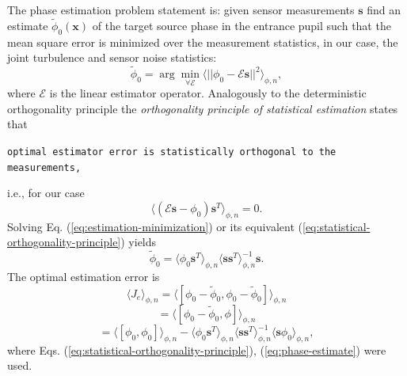 The phase estimation problem statement is: given sensor measurements $\bm{s}$
find an estimate $\tilde{\phi}_{0}(\bm{x})$ of the target source phase in the
entrance pupil such
that the mean square error is minimized over the measurement statistics, in
our case, the joint turbulence and sensor noise statistics:
\begin{equation} \label{eq:estimation-minimization}
	\tilde{\phi}_{0} =
	\arg \min_{\forall \mathcal{E}}
	\langle
	||\phi_{0} - \mathcal{E} \bm{s}||^{2}
	\rangle_{\phi,n},
\end{equation}
where $\mathcal{E}$ is the linear estimator operator.
Analogously to the deterministic orthogonality principle the \emph{orthogonality
principle of statistical estimation}  states that
\begin{flushleft}
	\texttt{optimal estimator error is statistically orthogonal to the
	measurements,}
\end{flushleft}
i.e., for our case
\begin{equation} \label{eq:statistical-orthogonality-principle}
	\langle ( \mathcal{E}\bm{s} - \phi_{0} ) \bm{s}^{T} \rangle_{\phi,n} = 0.
\end{equation}
Solving Eq. (\ref{eq:estimation-minimization}) or its equivalent
(\ref{eq:statistical-orthogonality-principle}) yields
\begin{equation} \label{eq:phase-estimate}
	\tilde{\phi}_{0} = \langle \phi_{0} \bm{s}^{T} \rangle_{\phi,n}
	                   \langle \bm{s} \bm{s}^{T} \rangle_{\phi,n}^{-1} \bm{s}.
\end{equation}
The optimal estimation error is
\begin{equation} \label{eq:estimation-error}
  \langle J_{e} \rangle_{\phi,n} =
	\langle
	[\phi_{0} - \tilde{\phi}_{0},\phi_{0} - \tilde{\phi}_{0}]
	\rangle_{\phi,n}
\end{equation}
$$
  = \langle [\phi_{0} - \tilde{\phi}_{0},\phi] \rangle_{\phi,n}
$$
$$
  = \langle [\phi_{0},\phi_{0}] \rangle_{\phi,n} -
    \langle \phi_{0} \bm{s}^{T} \rangle_{\phi,n}
	  \langle \bm{ss}^{T} \rangle_{\phi,n}^{-1}
	  \langle \bm{s} \phi_{0} \rangle_{\phi,n},
$$
where Eqs. (\ref{eq:statistical-orthogonality-principle}),
           (\ref{eq:phase-estimate}) were used.

